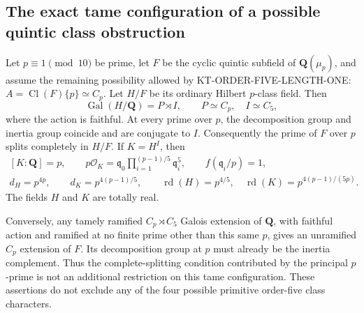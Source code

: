 \subsection{The exact tame configuration of a possible quintic class obstruction}

\begin{proposition}
Let $p\equiv1\pmod {10}$ be prime, let $F$ be the cyclic quintic
subfield of $\mathbf Q(\mu_p)$, and assume the remaining possibility
allowed by KT-ORDER-FIVE-LENGTH-ONE:
$A=\operatorname{Cl}(F)\{p\}\simeq C_p$.
Let $H/F$ be its ordinary Hilbert $p$-class field.  Then
\[
 \operatorname{Gal}(H/\mathbf Q)=P\rtimes I,
 \qquad P\simeq C_p,\quad I\simeq C_5,                 \tag{QTC.1}
\]
where the action is faithful.  At every prime over $p$, the
decomposition group and inertia group coincide and are conjugate to
$I$.  Consequently the prime of $F$ over $p$ splits completely in
$H/F$.  If $K=H^I$, then
\[
 \begin{gathered}
 [K:\mathbf Q]=p,\qquad
 p\mathcal O_K=\mathfrak q_0
       \prod_{i=1}^{(p-1)/5}\mathfrak q_i^5,
 \qquad f(\mathfrak q_i/p)=1,\\
 d_H=p^{4p},\qquad d_K=p^{4(p-1)/5},\qquad
 \operatorname{rd}(H)=p^{4/5},\quad
 \operatorname{rd}(K)=p^{4(p-1)/(5p)}.                 \tag{QTC.2}
 \end{gathered}
\]
The fields $H$ and $K$ are totally real.

Conversely, any tamely ramified $C_p\rtimes C_5$ Galois extension
of $\mathbf Q$, with faithful action and ramified at no finite prime
other than this same $p$, gives an unramified $C_p$ extension of $F$.
Its decomposition group at $p$ must already be the inertia complement.
Thus the complete-splitting condition contributed by the principal
$p$-prime is not an additional restriction on this tame configuration.
These assertions do not exclude any of the four possible primitive
order-five class characters.
\end{proposition}

